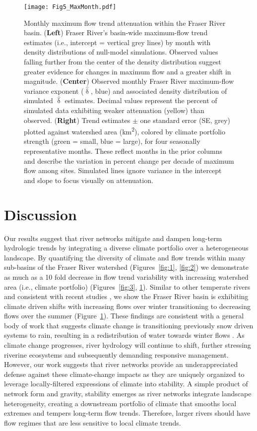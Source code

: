 \documentclass[draft,linenumbers]{AGUJournal}
\begin{document}
\begin{figure}[h]
\centering
\texttt{[image: Fig5\_MaxMonth.pdf]}
	\caption{Monthly maximum flow trend attenuation within the Fraser River basin. (\textbf{Left}) Fraser River's basin-wide maximum-flow trend estimates (i.e., intercept = vertical grey lines) by month with density distributions of null-model simulations. Observed values falling further from the center of the density distribution suggest greater evidence for changes in maximum flow and a greater shift in magnitude. (\textbf{Center}) Observed monthly Fraser River maximum-flow variance exponent ($\hat{\updelta}$, blue) and associated density distribution of simulated $\hat{\updelta}$ estimates. Decimal values represent the percent of simulated data exhibiting weaker attenuation (yellow) than observed. (\textbf{Right}) Trend estimates $\pm$ one standard error (SE, grey) plotted against watershed area (km\textsuperscript{2}), colored by climate portfolio strength (green = small, blue = large), for four seasonally representative months. These reflect months in the prior columns and describe the variation in percent change per decade of maximum flow among sites. Simulated lines ignore variance in the intercept and slope to focus visually on attenuation.}
\label{fig:4}
\end{figure}

\section{Discussion}

Our results suggest that river networks mitigate and dampen long-term hydrologic trends by integrating a diverse climate portfolio over a heterogeneous landscape. By quantifying the diversity of climate and flow trends within many sub-basins of the Fraser River watershed (Figures~\ref{fig:1}, \ref{fig:2}) we demonstrate as much as a 10 fold decrease in flow trend variability with increasing watershed area (i.e., climate portfolio) (Figures~\ref{fig:3}, \ref{fig:4}). Similar to other temperate rivers \citep{Rauscher:2008} and consistent with recent studies \citep [e.g.,][]{Kang:2016, Kang:2014, Shrestha:2012}, we show the Fraser River basin is exhibiting climate driven shifts with increasing flows over winter transitioning to decreasing flows over the summer (Figure~\ref{fig:4}). These findings are consistent with a general body of work that suggests climate change is transitioning previously snow driven systems to rain, resulting in a redistribution of water towards winter flows \citep{Bindoff:2013}. As climate change progresses, river hydrology will continue to shift, further stressing riverine ecosystems and subsequently demanding responsive management. However, our work suggests that river networks provide an underappreciated defense against these climate-change impacts as they are uniquely organized to leverage locally-filtered expressions of climate into stability. A simple product of network form and gravity, stability emerges as river networks integrate landscape heterogeneity, creating a downstream portfolio of climate that smooths local extremes and tempers long-term flow trends. Therefore, larger rivers should have flow regimes that are less sensitive to local climate trends.
\end{document}

